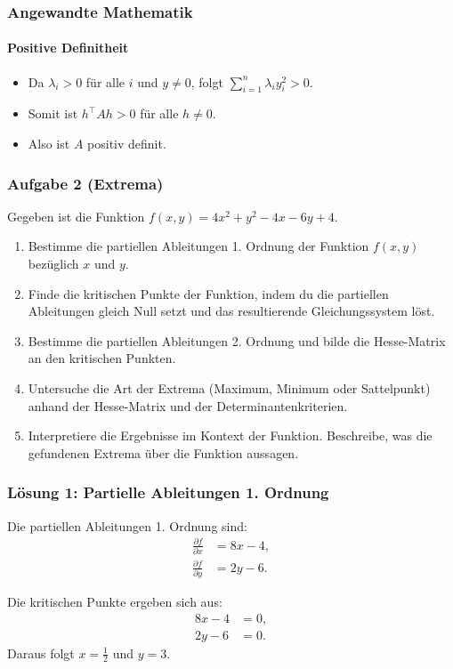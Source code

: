 \documentclass{beamer}
\begin{document}
 \begin{frame}
    \frametitle{Angewandte Mathematik}
    \framesubtitle{Positive Definitheit}
     \begin{itemize}
         \item Da \( \lambda_i > 0 \) für alle \( i \) und \( y \neq 0 \), folgt \( \sum_{i=1}^n \lambda_i y_i^2 > 0 \).
         \item Somit ist \( h^\top A h > 0 \) für alle \( h \neq 0 \).
         \item Also ist \( A \) positiv definit.
     \end{itemize}
 \end{frame}
 
 

 \begin{frame}
    \frametitle{Aufgabe 2 (Extrema)}
    Gegeben ist die Funktion \( f(x, y) = 4x^2 + y^2 - 4x - 6y + 4 \).
    
    \begin{enumerate}
        \item Bestimme die partiellen Ableitungen 1. Ordnung der Funktion \( f(x, y) \) bezüglich \( x \) und \( y \).
        \item Finde die kritischen Punkte der Funktion, indem du die partiellen Ableitungen gleich Null setzt und das resultierende Gleichungssystem löst.
        \item Bestimme die partiellen Ableitungen 2. Ordnung und bilde die Hesse-Matrix an den kritischen Punkten.
        \item Untersuche die Art der Extrema (Maximum, Minimum oder Sattelpunkt) anhand der Hesse-Matrix und der Determinantenkriterien.
        \item Interpretiere die Ergebnisse im Kontext der Funktion. Beschreibe, was die gefundenen Extrema über die Funktion aussagen.
    \end{enumerate}
\end{frame}

\begin{frame}
    \frametitle{Lösung 1: Partielle Ableitungen 1. Ordnung}
    Die partiellen Ableitungen 1. Ordnung sind:
    \begin{align*}
        \frac{\partial f}{\partial x} &= 8x - 4, \\
        \frac{\partial f}{\partial y} &= 2y - 6.
    \end{align*}

    Die kritischen Punkte ergeben sich aus:
    \begin{align*}
        8x - 4 &= 0, \\
        2y - 6 &= 0.
    \end{align*}
    Daraus folgt \( x = \frac{1}{2} \) und \( y = 3 \).
\end{frame}
\end{document}
